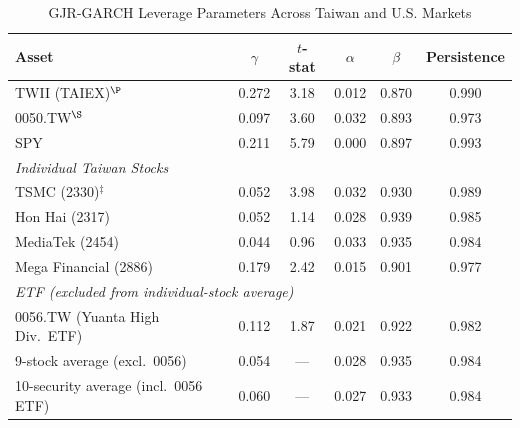 \begin{table}[H]
\centering
\caption{GJR-GARCH Leverage Parameters Across Taiwan and U.S. Markets}
\label{tab:gamma}
\begin{tabular}{lccccc}
\toprule
Asset & $\gamma$ & $t$-stat & $\alpha$ & $\beta$ & Persistence \\
\midrule
TWII (TAIEX)$^{\P}$ & 0.272 & 3.18 & 0.012 & 0.870 & 0.990 \\
0050.TW$^{\S}$ & 0.097 & 3.60 & 0.032 & 0.893 & 0.973 \\
SPY & 0.211 & 5.79 & 0.000 & 0.897 & 0.993 \\
\midrule
\multicolumn{6}{l}{\textit{Individual Taiwan Stocks}} \\
TSMC (2330)$^{\ddagger}$ & 0.052 & 3.98 & 0.032 & 0.930 & 0.989 \\
Hon Hai (2317) & 0.052 & 1.14 & 0.028 & 0.939 & 0.985 \\
MediaTek (2454) & 0.044 & 0.96 & 0.033 & 0.935 & 0.984 \\
Mega Financial (2886) & 0.179 & 2.42 & 0.015 & 0.901 & 0.977 \\
\midrule
\multicolumn{6}{l}{\textit{ETF (excluded from individual-stock average)}} \\
0056.TW (Yuanta High Div.\ ETF) & 0.112 & 1.87 & 0.021 & 0.922 & 0.982 \\
\midrule
9-stock average (excl.\ 0056) & 0.054 & --- & 0.028 & 0.935 & 0.984 \\
10-security average (incl.\ 0056 ETF) & 0.060 & --- & 0.027 & 0.933 & 0.984 \\
\bottomrule
\end{tabular}
\begin{flushleft}

\end{flushleft}
\end{table}
